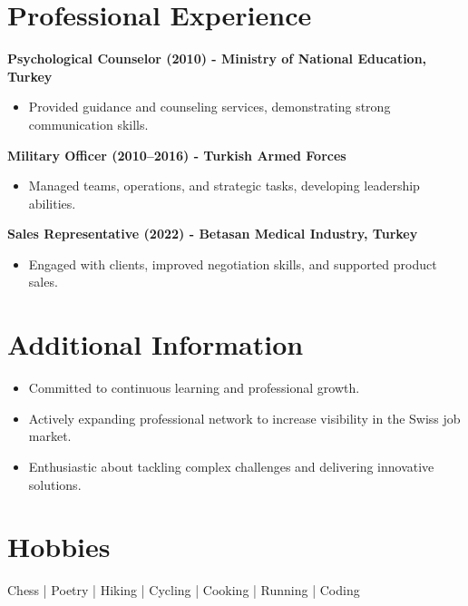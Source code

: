 \documentclass[a4paper,10pt]{article}
\begin{document}
\section*{Professional Experience}
\textbf{Psychological Counselor (2010) - Ministry of National Education, Turkey}
\begin{itemize}
    \item Provided guidance and counseling services, demonstrating strong communication skills.
\end{itemize}
\textbf{Military Officer (2010–2016) - Turkish Armed Forces}
\begin{itemize}
    \item Managed teams, operations, and strategic tasks, developing leadership abilities.
\end{itemize}
\textbf{Sales Representative (2022) - Betasan Medical Industry, Turkey}
\begin{itemize}
    \item Engaged with clients, improved negotiation skills, and supported product sales.
\end{itemize}

\section*{Additional Information}
\begin{itemize}
    \item Committed to continuous learning and professional growth.
    \item Actively expanding professional network to increase visibility in the Swiss job market.
    \item Enthusiastic about tackling complex challenges and delivering innovative solutions.
\end{itemize}

\section*{Hobbies}
Chess | Poetry | Hiking | Cycling | Cooking | Running | Coding
\end{document}
